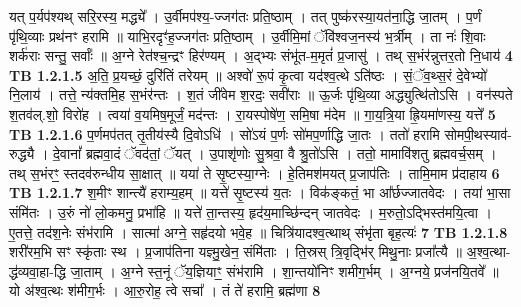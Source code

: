 \documentclass[17pt]{extarticle}
\begin{document}
                  यत् प॒र्यप॑श्यथ् सरि॒रस्य॒ मद्ध्ये᳚ । उ॒र्वीमप॑श्य॒-ज्जग॑तः प्रति॒ष्ठाम् । तत् पुष्क॑रस्या॒यत॑ना॒द्धि जा॒तम् । प॒र्णं पृ॑थि॒व्याः प्रथ॑नꣳ हरामि ॥ याभि॒रदृꣳ॑ह॒ज्जग॑तः प्रति॒ष्ठाम् । उ॒र्वीमि॒मां ॅवि॑श्वज॒नस्य॑ भ॒र्त्रीम् । ता नः॑ शि॒वाः शर्क॑राः सन्तु॒ सर्वाः᳚ ॥ अ॒ग्ने रेत॑श्च॒न्द्रꣳ हिर॑ण्यम् । अ॒द्भ्यः संभू॑त-म॒मृतं॑ प्र॒जासु॑ । तथ् स॒भंर॑न्नुत्तर॒तो नि॒धाय॑ \textbf{ 4} \newline
                  \newline
                                \textbf{ TB 1.2.1.5} \newline
                  अ॒ति॒ प्र॒यच्छं॒ दुरि॑तिं तरेयम् ॥ अश्वो॑ रू॒पं कृ॒त्वा यद॑श्व॒त्थे ऽति॑ष्ठः । सं॒ॅव॒थ्स॒रं दे॒वेभ्यो॑ नि॒लाय॑ । तत्ते॒ न्य॑क्तमि॒ह स॒भंर॑न्तः । श॒तं जी॑वेम श॒रदः॒ सवी॑राः ॥ ऊ॒र्जः पृ॑थि॒व्या अद्ध्युत्थि॑तोऽसि । वन॑स्पते श॒तव॑ल्.शो॒ विरो॑ह । त्वया॑ व॒यमिष॒मूर्जं॒ मद॑न्तः । रा॒यस्पोषे॑ण॒ समि॒षा म॑देम ॥ गा॒य॒त्रि॒या ह्रि॒यमा॑णस्य॒ यत्ते᳚ \textbf{ 5} \newline
                  \newline
                                \textbf{ TB 1.2.1.6} \newline
                  प॒र्णमप॑तत् तृ॒तीय॑स्यै दि॒वोऽधि॑ । सो॑ऽयं प॒र्णः सो॑मप॒र्णाद्धि जा॒तः । ततो॑ हरामि सोमपी॒थस्याव॑-रुद्ध्यै । दे॒वानां᳚ ब्रह्मवा॒दं ॅवद॑तां॒ ॅयत् । उ॒पाशृ॑णोः सु॒श्रवा॒ वै श्रु॒तो॑ऽसि । ततो॒ मामावि॑शतु ब्रह्मवर्च॒सम् । तथ् स॒भंरꣳ॒॒ स्तदव॑रुन्धीय सा॒क्षात् ॥ यया॑ ते सृ॒ष्टस्या॒ग्नेः । हे॒तिमश॑मयत् प्र॒जाप॑तिः । तामि॒माम प्र॑दाहाय \textbf{ 6} \newline
                  \newline
                                \textbf{ TB 1.2.1.7} \newline
                  श॒मीꣳ शान्त्यै॑ हराम्य॒हम् ॥ यत्ते॑ सृ॒ष्टस्य॑ य॒तः । विक॑ङ्कतं॒ भा आ᳚र्छज्जातवेदः । तया॑ भा॒सा संमि॑तः । उ॒रुं नो॑ लो॒कमनु॒ प्रभा॑हि ॥ यत्ते॑ ता॒न्तस्य॒ हृद॑य॒माच्छि॑न्दन् जातवेदः । म॒रुतो॒ऽद्भिस्त॑मयि॒त्वा । ए॒तत्ते॒ तद॑श॒नेः संभ॑रामि । सात्मा॑ अग्ने॒ सहृ॑दयो भवे॒ह ॥ चित्रि॑यादश्व॒त्थाथ् संभृ॑ता बृह॒त्यः॑ \textbf{ 7} \newline
                  \newline
                                \textbf{ TB 1.2.1.8} \newline
                  शरी॑रम॒भि सꣳ स्कृ॑ताः स्थ । प्र॒जाप॑तिना यज्ञ्मु॒खेन॒ संमि॑ताः । ति॒स्रस् त्रि॒वृद्भि॑र् मिथु॒नाः प्रजा᳚त्यै ॥ अ॒श्व॒त्था-द्ध॑व्यवा॒हा-द्धि जा॒ताम् । अ॒ग्ने स्त॒नूं ॅय॒ज्ञियाꣳ॒॒ संभ॑रामि । शा॒न्तयो॑निꣳ शमीग॒र्भम् । अ॒ग्नये॒ प्रज॑नयि॒तवे᳚ ॥ यो अ॑श्व॒त्थः श॑मीग॒र्भः । आ॒रु॒रोह॒ त्वे सचा᳚ । तं ते॑ हरामि॒ ब्रह्म॑णा \textbf{ 8} \newline
\end{document}
